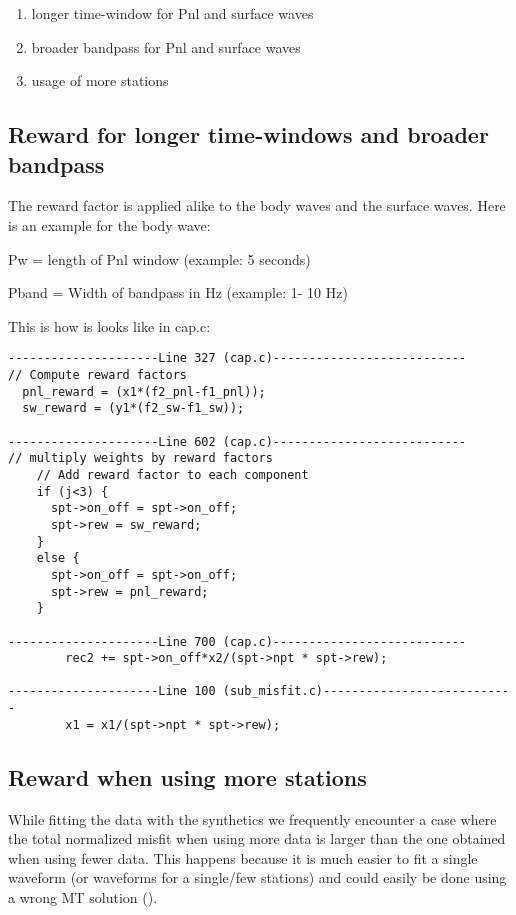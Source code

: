 \documentclass[11pt,titlepage,fleqn]{article}
\begin{document}
\begin{enumerate}
\item longer time-window for Pnl and surface waves
\item broader bandpass for Pnl and surface waves
\item usage of more stations
\end{enumerate}

\subsection{Reward for longer time-windows and broader bandpass}
The reward factor is applied alike to the body waves and the surface waves. Here is an example for the body wave:

\begin{description}
\item Pw = length of Pnl window (example: 5 seconds) 
\item Pband = Width of bandpass in Hz (example: 1- 10 Hz) 
\end{description}


This is how is looks like in cap.c:
\begin{verbatim}
---------------------Line 327 (cap.c)---------------------------
// Compute reward factors
  pnl_reward = (x1*(f2_pnl-f1_pnl));
  sw_reward = (y1*(f2_sw-f1_sw));

---------------------Line 602 (cap.c)---------------------------
// multiply weights by reward factors
	// Add reward factor to each component
	if (j<3) {
	  spt->on_off = spt->on_off;
	  spt->rew = sw_reward;
	}
	else {
	  spt->on_off = spt->on_off;
	  spt->rew = pnl_reward;
	}

---------------------Line 700 (cap.c)---------------------------
        rec2 += spt->on_off*x2/(spt->npt * spt->rew);

---------------------Line 100 (sub_misfit.c)---------------------------
        x1 = x1/(spt->npt * spt->rew);

\end{verbatim}


\subsection{Reward when using more stations}
While fitting the data with the synthetics we frequently encounter a case where the total normalized misfit when using more data is larger than the one obtained when using fewer data. This happens because it is much easier to fit a single waveform (or waveforms for a single/few stations) and could easily be done using a wrong MT solution (). 
\end{document}
